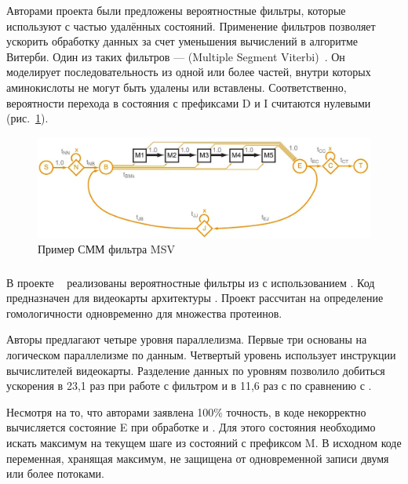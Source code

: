Авторами проекта были предложены вероятностные фильтры, которые используют 
 с частью удалённых состояний.
Применение фильтров позволяет ускорить обработку данных за счет уменьшения
вычислений в алгоритме Витерби.
Один из таких фильтров ---  (Multiple Segment 
Viterbi)~\cite{MSV_Eddy}.
Он моделирует последовательность из одной или более частей, внутри которых
аминокислоты не могут быть удалены или вставлены.
Соответственно, вероятности перехода в состояния с префиксами D и I считаются 
нулевыми (рис.~\ref{MSV_example}).
\begin{figure}
  \centering
  \includegraphics[width=\columnwidth]{MSV.png}
  \caption{Пример СММ фильтра MSV~\cite{MSV_Eddy}}
  \label{MSV_example}
\end{figure}

\subsubsection{}
В проекте ~\cite{cudampf} реализованы вероятностные фильтры из 
 с использованием .
Код предназначен для видеокарты   архитектуры
.
Проект рассчитан на определение гомологичности одновременно для множества 
протеинов.

Авторы предлагают четыре уровня параллелизма.
Первые три основаны на логическом параллелизме по данным.
Четвертый уровень использует  инструкции вычислителей видеокарты.
Разделение данных по уровням позволило добиться ускорения в 23,1 раз при работе 
с фильтром  и в 11,6 раз с  по сравнению с
.

Несмотря на то, что авторами заявлена 100\% точность, в коде некорректно
вычисляется состояние E при обработке  и .
Для этого состояния необходимо искать максимум на текущем шаге из состояний с 
префиксом M.
В исходном коде  переменная, хранящая максимум, не защищена от 
одновременной записи двумя или более потоками.


